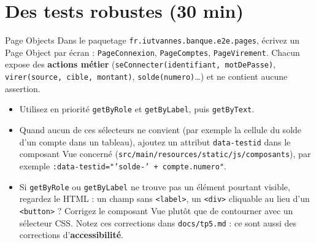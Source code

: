 \documentclass[11pt]{article}
\begin{document}
\section{Des tests robustes (30 min)}

\begin{exobox}{Page Objects}
Dans le paquetage \texttt{fr.iutvannes.banque.e2e.pages}, écrivez un Page Object par écran : \texttt{PageConnexion}, \texttt{PageComptes}, \texttt{PageVirement}. Chacun expose des \textbf{actions métier} (\texttt{seConnecter(identifiant, motDePasse)}, \texttt{virer(source, cible, montant)}, \texttt{solde(numero)}\ldots) et ne contient aucune assertion.
\begin{itemize}[leftmargin=1.2em]
  \item Utilisez en priorité \texttt{getByRole} et \texttt{getByLabel}, puis \texttt{getByText}.
  \item Quand aucun de ces sélecteurs ne convient (par exemple la cellule du solde d'un compte dans un tableau), ajoutez un attribut \texttt{data-testid} dans le composant Vue concerné (\texttt{src/main/resources/static/js/composants}), par exemple \texttt{:data-testid="'solde-' + compte.numero"}.
  \item Si \texttt{getByRole} ou \texttt{getByLabel} ne trouve pas un élément pourtant visible, regardez le HTML : un champ sans \texttt{<label>}, un \texttt{<div>} cliquable au lieu d'un \texttt{<button>} ? Corrigez le composant Vue plutôt que de contourner avec un sélecteur CSS. Notez ces corrections dans \texttt{docs/tp5.md} : ce sont aussi des corrections d'\textbf{accessibilité}.
\end{itemize}
\end{exobox}
\end{document}
